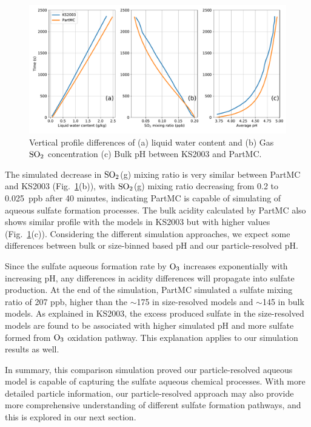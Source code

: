 \documentclass[edeposit,fullpage]{uiucthesis2009}
\begin{document}
\begin{figure}[ht]
    \centering \includegraphics[scale=0.5]{chap2_figs/chap2_fig1_profile.pdf}
    \caption{Vertical profile differences of (a) liquid water content
      and (b) Gas $\rm SO_2$ concentration (c) Bulk pH between KS2003
      and PartMC.}
    \label{chap2:ks2003}
\end{figure}

The simulated decrease in $\rm SO_2$(g) mixing ratio is very similar
between PartMC and KS2003 (Fig.~\ref{chap2:ks2003}(b)), with $\rm
SO_2$(g) mixing ratio decreasing from 0.2 to 0.025~ppb after 40
minutes, indicating PartMC is capable of simulating of aqueous sulfate
formation processes. The bulk acidity calculated by PartMC also shows
similar profile with the models in KS2003 but with higher values
(Fig.~\ref{chap2:ks2003}(c)). Considering the different simulation
approaches, we expect some differences between bulk or size-binned
based pH and our particle-resolved pH.

Since the sulfate aqueous formation rate by $\rm O_3$ increases
exponentially with increasing pH, any differences in acidity
differences will propagate into sulfate production. At the end of the
simulation, PartMC simulated a sulfate mixing ratio of 207 ppb, higher
than the $\sim$175 in size-resolved models and $\sim$145 in bulk
models. As explained in KS2003, the excess produced sulfate in the
size-resolved models are found to be associated with higher simulated
pH and more sulfate formed from $\rm O_3$ oxidation pathway. This
explanation applies to our simulation results as well.

In summary, this comparison simulation proved our particle-resolved
aqueous model is capable of capturing the sulfate aqueous chemical
processes.  With more detailed particle information, our
particle-resolved approach may also provide more comprehensive
understanding of different sulfate formation pathways, and this is
explored in our next section.
\end{document}
